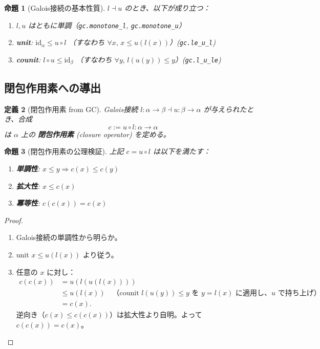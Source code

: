 \documentclass[a4paper,12pt]{ltjsarticle}
\newtheorem{definition}{定義}[section]
\newtheorem{proposition}[definition]{命題}
\newcommand{\Lean}[1]{\texttt{\color{blue}#1}}
\begin{document}
\begin{proposition}[Galois接続の基本性質]
$l \dashv u$ のとき、以下が成り立つ：
\begin{enumerate}
  \item $l, u$ はともに単調（\Lean{gc.monotone\_l}, \Lean{gc.monotone\_u}）
  \item \textbf{unit}: $\mathrm{id}_\alpha \le u \circ l$ （すなわち $\forall x,\, x \le u(l(x))$）\quad (\Lean{gc.le\_u\_l})
  \item \textbf{counit}: $l \circ u \le \mathrm{id}_\beta$ （すなわち $\forall y,\, l(u(y)) \le y$）\quad (\Lean{gc.l\_u\_le})
\end{enumerate}
\end{proposition}

\subsection{閉包作用素への導出}

\begin{definition}[閉包作用素 from GC]
Galois接続 $l : \alpha \to \beta \dashv u : \beta \to \alpha$ が与えられたとき、合成
\[
  c := u \circ l : \alpha \to \alpha
\]
は $\alpha$ 上の \textbf{閉包作用素} (closure operator) を定める。
\end{definition}

\begin{proposition}[閉包作用素の公理検証]
上記 $c = u \circ l$ は以下を満たす：
\begin{enumerate}
  \item \textbf{単調性}: $x \le y \Rightarrow c(x) \le c(y)$
  \item \textbf{拡大性}: $x \le c(x)$
  \item \textbf{冪等性}: $c(c(x)) = c(x)$
\end{enumerate}
\end{proposition}

\begin{proof}
\begin{enumerate}
  \item Galois接続の単調性から明らか。
  \item unit $x \le u(l(x))$ より従う。
  \item 任意の $x$ に対し：
  \begin{align*}
    c(c(x)) &= u(l(u(l(x)))) \\
    &\le u(l(x)) \quad \text{（counit $l(u(y)) \le y$ を $y = l(x)$ に適用し、$u$ で持ち上げ）} \\
    &= c(x).
  \end{align*}
  逆向き（$c(x) \le c(c(x))$）は拡大性より自明。よって $c(c(x)) = c(x)$。\qedhere
\end{enumerate}
\end{proof}
\end{document}
